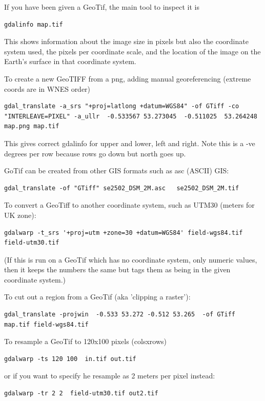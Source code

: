\documentclass[oneside,english]{scrbook}
\begin{document}
If you have been given a GeoTif, the main tool to inspect it is
\begin{lstlisting}
gdalinfo map.tif
\end{lstlisting}

This shows information about the image size in pixels but also the coordinate system used, the pixels per coordinate scale, and the location of the image on the Earth's surface in that coordinate system.

To create a new GeoTIFF from a png, adding manual georeferencing (extreme coords are in WNES order)

\begin{lstlisting}
gdal_translate -a_srs "+proj=latlong +datum=WGS84" -of GTiff -co "INTERLEAVE=PIXEL" -a_ullr  -0.533567 53.273045  -0.511025  53.264248   map.png map.tif
\end{lstlisting}

This gives correct gdalinfo for upper and lower, left and right.  Note this is a -ve degrees per row because rows go down but north goes up.

GoTif can be created from other GIS formats such as asc (ASCII) GIS:
\begin{lstlisting}
gdal_translate -of "GTiff" se2502_DSM_2M.asc   se2502_DSM_2M.tif
\end{lstlisting}

To convert a GeoTiff to another coordinate system, such as UTM30 (meters for UK zone):
\begin{lstlisting}
gdalwarp -t_srs '+proj=utm +zone=30 +datum=WGS84' field-wgs84.tif field-utm30.tif
\end{lstlisting}
(If this is run on a GeoTif which has no coordinate system, only numeric values, then it keeps the numbers the same but tags them as being in the given coordinate system.)

To cut out a region from a GeoTif (aka 'clipping a raster'):
\begin{lstlisting}
gdal_translate -projwin  -0.533 53.272 -0.512 53.265  -of GTiff map.tif field-wgs84.tif
\end{lstlisting}

To resample a GeoTif to 120x100 pixels (colsxrows)
\begin{lstlisting}
gdalwarp -ts 120 100  in.tif out.tif
\end{lstlisting}

or if you want to specify he resample as 2 meters per pixel instead:
\begin{lstlisting}
gdalwarp -tr 2 2  field-utm30.tif out2.tif
\end{lstlisting}
\end{document}
